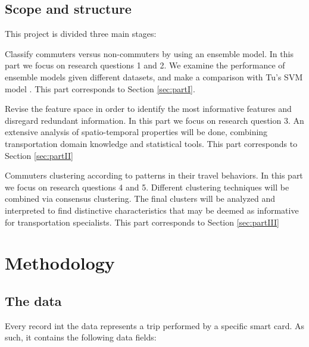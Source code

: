 \documentclass{article}
\begin{document}
\subsection{Scope and structure}
This project is divided three main stages: 

\begin{description}[align=left,labelwidth=2cm]
\item[PART I] Classify commuters versus non-commuters by using an ensemble model. In this part we focus on research questions 1 and 2. We examine the performance of ensemble models given different datasets, and make a comparison with Tu's SVM model \cite{tu2016impact}. This part corresponds to Section \ref{sec:partI}.

\item[PART II] Revise the feature space in order to identify the most informative features and disregard redundant information. In this part we focus on research question 3. An extensive analysis of spatio-temporal properties will be done, combining transportation domain knowledge and statistical tools. This part corresponds to Section \ref{sec:partII}

\item[PART III] Commuters clustering according to patterns in their travel behaviors. In this part we focus on research questions 4 and 5. Different clustering techniques will be combined via consensus clustering. The final clusters will be analyzed and interpreted to find distinctive characteristics that may be deemed as informative for transportation specialists. This part corresponds to Section \ref{sec:partIII}
\end{description}


\newpage
\section{Methodology}
\subsection{The data}
\label{sec:data}
Every record int the data represents a trip performed by a specific smart card. As such, it contains the following data fields:
\end{document}
